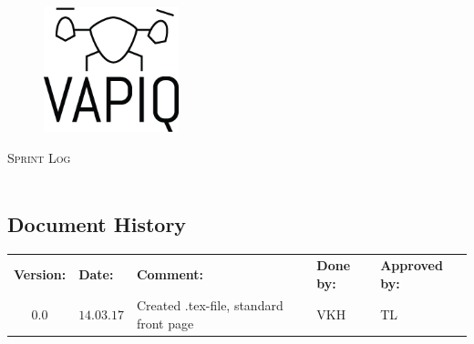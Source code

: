 \documentclass{article}
\author{Aleksander Holthe  \\ Katrine Sundal Haune \\ Kent Kjeldaas \\ Stian Fredriksen \\ Tomas Lyngroth \\ Vanja Katinka Halvorsen}
\makeatletter
\let\vapiqteam\@author
\makeatother
\begin{document}
\begin{titlepage}
    \centering
    \pagecolor{gainsboro}
	\\[3.0 cm]
    \begin{figure}[h]
        \centering
        \includegraphics[width = 0.35\textwidth]{VAPIQ-PICTURES//Logo2_Tilted.png}
        \\[2.0 cm] 
    \end{figure}                              
    \textsc{\Huge Sprint Log}  
    \\[1 cm]
    \textsc{\Large }   
    \\[3.0 cm]
	\large \vapiqteam      
\end{titlepage}
\pagecolor{white}


\begin{center}
\section*{\textbf{Document History}}
\begin{tabular}{cllll}
\rowcolor{cadetgrey}
\textbf{Version:}    &\textbf{Date:} 	 &\textbf{Comment:}    &\textbf{Done by:}   &\textbf{Approved by:}  \\

0.0       & $14.03.17$   & Created .tex-file, standard front page  & VKH  & TL \\

\end{tabular}                                                                   
\end{center}
\end{document}
